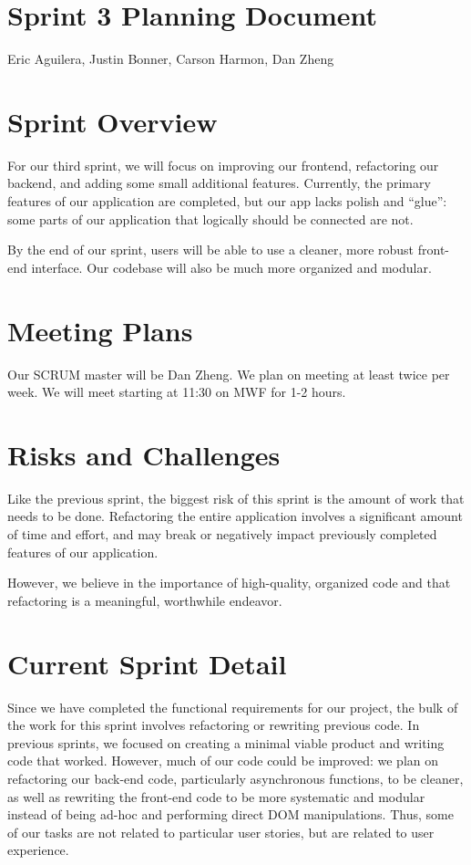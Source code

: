 \documentclass[12pt]{article}
\newcommand{\br}{\vspace{2mm}}
\newcommand{\hwTitle}{Sprint 3 Planning Document}
\newcommand{\authorName}{Eric Aguilera, Justin Bonner, Carson Harmon, Dan Zheng}
\begin{document}
\section*{\Large \centering \hwTitle}
{\centering \authorName \par}

\section{Sprint Overview}

For our third sprint, we will focus on improving our frontend, refactoring our backend, and adding some small additional features. Currently, the primary features of our application are completed, but our app lacks polish and ``glue'': some parts of our application that logically should be connected are not.

By the end of our sprint, users will be able to use a cleaner, more robust front-end interface. Our codebase will also be much more organized and modular.

\section{Meeting Plans}

Our SCRUM master will be Dan Zheng. We plan on meeting at least twice per week. We will meet starting at 11:30 on MWF for 1-2 hours.

\section{Risks and Challenges}

Like the previous sprint, the biggest risk of this sprint is the amount of work that needs to be done. Refactoring the entire application involves a significant amount of time and effort, and may break or negatively impact previously completed features of our application.

\br

However, we believe in the importance of high-quality, organized code and that refactoring is a meaningful, worthwhile endeavor.

\section{Current Sprint Detail}

Since we have completed the functional requirements for our project, the bulk of the work for this sprint involves refactoring or rewriting previous code. In previous sprints, we focused on creating a minimal viable product and writing code that worked. However, much of our code could be improved: we plan on refactoring our back-end code, particularly asynchronous functions, to be cleaner, as well as rewriting the front-end code to be more systematic and modular instead of being ad-hoc and performing direct DOM manipulations. Thus, some of our tasks are not related to particular user stories, but are related to user experience.
\end{document}
